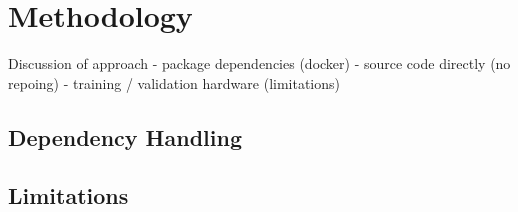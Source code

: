 \section{Methodology}
\label{chap:methodology}

Discussion of approach
 - package dependencies (docker)
 - source code directly (no repoing)
 - training / validation hardware (limitations)

\subsection{Dependency Handling}
\label{dependency-handling}

\subsection{Limitations}
\label{limitations}
